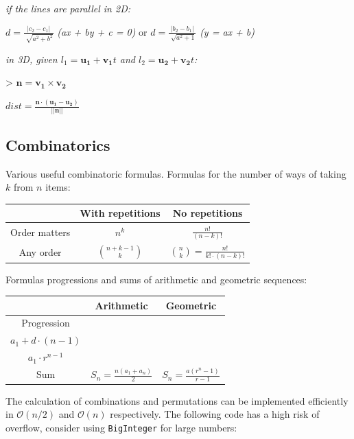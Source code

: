 \documentclass[8pt,a4paper,landscape,oneside]{amsart}
\newcommand{\code}[1]{\inputminted[fontsize=\normalsize,baselinestretch=1]{java}{code/#1}}
\newcommand{\bigO}{\mathcal{O}}
\begin{document}
\begin{multicols*}{3}
  \textit{if the lines are parallel in 2D:}

  $d = \frac{|c_2 - c_1|}{\sqrt[]{a^2 + b^2}}$ \textit{(ax + by + c = 0)} or $d = \frac{|b_2 - b_1|}{\sqrt[]{a^2 + 1}}$ \textit{(y = ax + b)}
  \newline

  \textit{in 3D, given $l_1 = \mathbf{u_1} + \mathbf{v_1}t$ and $l_2 = \mathbf{u_2} + \mathbf{v_2}t$:}

  > $\mathbf{n} = \mathbf{v_1} \times \mathbf{v_2}$

  $dist = \frac{\mathbf{n\cdot (u_1 - u_2)}}{||\mathbf{n}||}$
  
  \subsection{Combinatorics}
  Various useful combinatoric formulas.
  Formulas for the number of ways of taking $k$ from $n$ items:
  \begin{center}
  \begin{tabular}{|c|c|c|} \hline
  & With repetitions & No repetitions \\
  \hline
  Order matters & $n^k$ & $\frac{n!}{(n-k)!}$ \\ \hline
  Any order & $\binom{n+k-1}{k}$ & $\binom{n}{k} = \frac{n!}{k!\cdot(n-k)!}$ \\ \hline
  \end{tabular}
  \end{center}
  Formulas progressions and sums of arithmetic and geometric sequences:
  \begin{center}
  \begin{tabular}{|c|c|c|} \hline
  & Arithmetic & Geometric \\
  \hline
  Progression & \shortstack{$a_n = a_{n-1} + d =$ \\ $a_1 + d\cdot(n-1)$} & \shortstack{$a_n = a_{n-1}\cdot r =$ \\ $a_1\cdot r^{n-1}$} \\ \hline
  Sum & $S_n = \frac{n(a_1+a_n)}{2}$ & $S_n = \frac{a(r^n-1)}{r-1}$ \\ \hline
  \end{tabular}
  \end{center}
  
  The calculation of combinations and permutations can be implemented efficiently in $\bigO(n/2)$ and $\bigO(n)$ respectively. The following code has a high risk of overflow, consider using \texttt{BigInteger} for large numbers:
  \code{Math/Combinatorics.java}
  

\end{multicols*}
\end{document}
